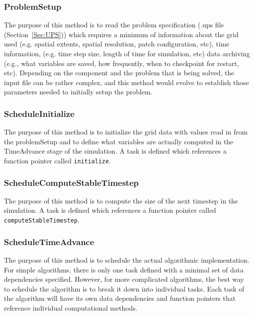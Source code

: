 \subsubsection{ProblemSetup}


The purpose of this method is to read the problem specification (.ups
file (Section~\ref{Sec:UPS})) which
requires a minimum of information about the grid used (e.g. spatial extents,
spatial resolution, patch configuration, etc), time
information, (e.g. time step size, length of time for simulation, etc)
data archiving (e.g., what variables are saved, how frequently, when to
checkpoint for restart, etc).  Depending on the component and the problem
that is being solved, the input file can be rather complex, and this method
would evolve to establish those parameters needed to initially
setup the problem.

\subsubsection{ScheduleInitialize}

The purpose of this method is to initialize the grid data with values
read in from the problemSetup and to define what variables are
actually computed in the TimeAdvance stage of the simulation.  A task
is defined which references a function pointer called
\texttt{initialize}.

\subsubsection{ScheduleComputeStableTimestep}

The purpose of this method is to compute the size of the next timestep in the
simulation.  A task is defined which references a function pointer
called \texttt{computeStableTimestep}.

\subsubsection{ScheduleTimeAdvance}

The purpose of this method is to schedule the actual algorithmic
implementation.  For simple algorithms, there is only one task defined
with a minimal set of data dependencies specified.  However, for more
complicated algorithms, the best way to schedule the algorithm is to
break it down into individual tasks.  Each task of the algorithm will
have its own data dependencies and function pointers that reference
individual computational methods.

